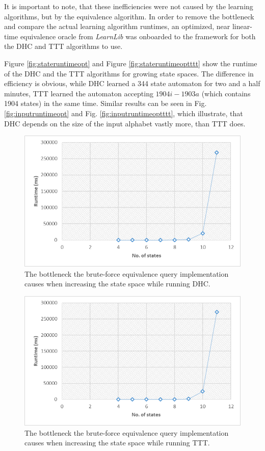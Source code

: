 It is important to note, that these inefficiencies were not caused by the learning algorithms, but by the equivalence algorithm. In order to remove the bottleneck and compare the actual learning algorithm runtimes, an optimized, near linear-time equivalence oracle from \emph{LearnLib} was onboarded to the framework for both the DHC and TTT algorithms to use.

Figure \ref{fig:stateruntimeopt} and Figure \ref{fig:stateruntimeoptttt} show the runtime of the DHC and the TTT algorithms for growing state spaces. The difference in efficiency is obvious, while DHC learned a 344 state automaton for two and a half minutes, TTT learned the automaton accepting $1904i-1903a$ (which contains 1904 states) in the same time. Similar results can be seen in Fig. \ref{fig:inputruntimeopt} and Fig. \ref{fig:inputruntimeoptttt}, which illustrate, that DHC depends on the size of the input alphabet vastly more, than TTT does.

\begin{figure}
	\centering
	\includegraphics[width=0.7\linewidth]{figures/stateruntime}
	\caption{The bottleneck the brute-force equivalence query implementation causes when increasing the state space while running DHC.}
	\label{fig:stateruntime}
\end{figure}

\begin{figure}
	\centering
	\includegraphics[width=0.7\linewidth]{figures/stateruntimettt}
	\caption{The bottleneck the brute-force equivalence query implementation causes when increasing the state space while running TTT.}
	\label{fig:stateruntimettt}
\end{figure}

